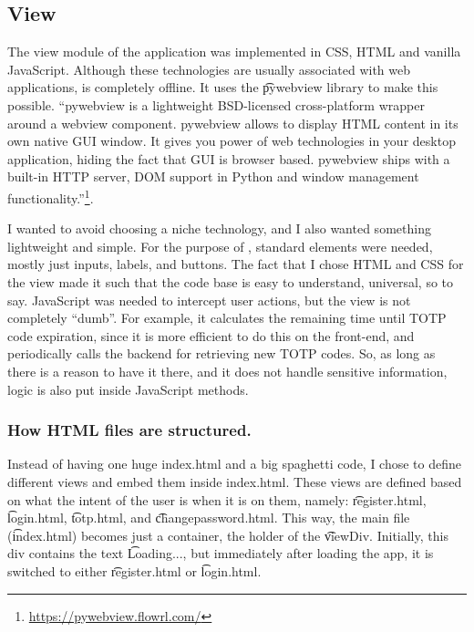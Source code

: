 \subsection{View} \label{lab:ch4-view}

The view module of the application was implemented in CSS, HTML and vanilla JavaScript.
Although these technologies are usually associated with web applications, \app{} is completely offline.
It uses the \t{pywebview} library to make this possible.
``pywebview is a lightweight BSD-licensed cross-platform wrapper around a webview component.
pywebview allows to display HTML content in its own native GUI window.
It gives you power of web technologies in your desktop application, hiding the fact that GUI is browser based.
pywebview ships with a built-in HTTP server, DOM support in Python and window management functionality.''\footnote{\url{https://pywebview.flowrl.com/}}.

I wanted to avoid choosing a niche technology, and I also wanted something lightweight and simple.
For the purpose of \app{}, standard elements were needed, mostly just inputs, labels, and buttons.
The fact that I chose HTML and CSS for the view made it such that the code base is easy to understand, universal, so to say.
JavaScript was needed to intercept user actions, but the view is not completely ``dumb''.
For example, it calculates the remaining time until TOTP code expiration, since it is more efficient to do this on the front-end, and periodically calls the backend for retrieving new TOTP codes.
So, as long as there is a reason to have it there, and it does not handle sensitive information, logic is also put inside JavaScript methods.

\subsubsection{How HTML files are structured.} \label{lab:ch4-html}

Instead of having one huge index.html and a big spaghetti code, I chose to define different views and embed them inside index.html.
These views are defined based on what the intent of the user is when it is on them, namely: \t{register.html}, \t{login.html}, \t{totp.html}, and \t{changepassword.html}.
This way, the main file (\t{index.html}) becomes just a container, the holder of the \t{viewDiv}.
Initially, this div contains the text \t{Loading...}, but immediately after loading the app, it is switched to either \t{register.html} or \t{login.html}.

